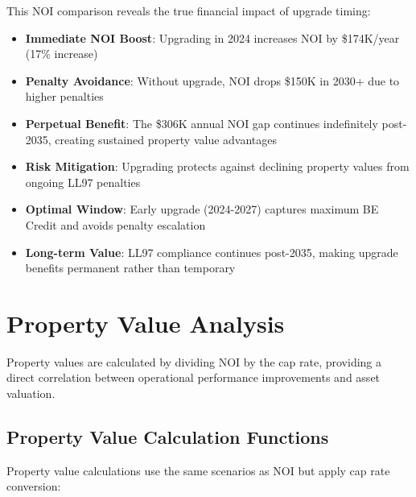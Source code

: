 \documentclass{article}
\begin{document}
\begin{center}
\end{center}

This NOI comparison reveals the true financial impact of upgrade timing:
\begin{itemize}
    \item \textbf{Immediate NOI Boost}: Upgrading in 2024 increases NOI by \$174K/year (17\% increase)
    \item \textbf{Penalty Avoidance}: Without upgrade, NOI drops \$150K in 2030+ due to higher penalties  
    \item \textbf{Perpetual Benefit}: The \$306K annual NOI gap continues indefinitely post-2035, creating sustained property value advantages
    \item \textbf{Risk Mitigation}: Upgrading protects against declining property values from ongoing LL97 penalties
    \item \textbf{Optimal Window}: Early upgrade (2024-2027) captures maximum BE Credit and avoids penalty escalation
    \item \textbf{Long-term Value}: LL97 compliance continues post-2035, making upgrade benefits permanent rather than temporary
\end{itemize}

\section{Property Value Analysis}

Property values are calculated by dividing NOI by the cap rate, providing a direct correlation between operational performance improvements and asset valuation.

\subsection{Property Value Calculation Functions}

Property value calculations use the same scenarios as NOI but apply cap rate conversion:
\end{document}
